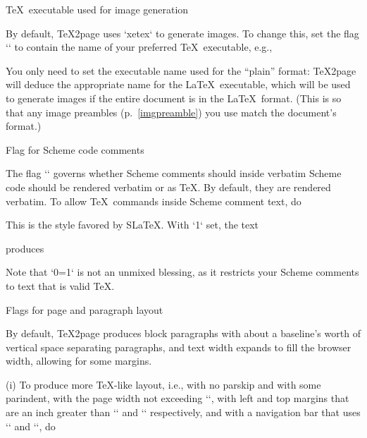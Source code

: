 \begintt
\def\TZPimageconverter{imagemagick}  %
\def\TZPimageconverter{netpbm}       %

\def\TZPimageformat{png}  %
\def\TZPimageformat{jpeg} %
\def\TZPimageformat{gif}  %
\endtt

\beginsection \TeX\ executable used for image generation

By default, \TeX2page uses `xetex` to
generate images. To change this, set the flag `\TZPtexprogname` to
contain the name of your preferred \TeX\ executable, e.g.,

\begintt
\def\TZPtexprogname{pdftex}
\endtt
%
You only need to set the executable name used for the “plain” format:
\TeX2page will deduce the appropriate name for the \LaTeX\ executable,
which will be used to generate images if the entire document is in the
\LaTeX\ format.  (This is so that any image preambles
(p.~\ref{imgpreamble}) you use match the
document’s format.)

\beginsection Flag for Scheme code comments

The flag `\TZPslatexcomments` governs whether Scheme comments
should inside verbatim Scheme code should be rendered verbatim or as \TeX.
By default, they are rendered verbatim.   To allow \TeX\ commands inside
Scheme comment text, do

\begintt
\let\TZPslatexcomments=1
\endtt
%
This is the style favored by S\LaTeX.
\ifx\shipout\UnDeFiNeD
With `\TZPslatexcomments` set, the text

\begintt
{}
\endtt
%
produces
\let\TZPslatexcomments 1

\let\TZPslatexcomments 0

\fi
Note that `\TZPslatexcomments=1` is not an unmixed blessing, as it
restricts your Scheme comments to text that is valid \TeX.

\beginsection Flags for page and paragraph layout

%
By default, \TeX2page produces block paragraphs with about a
baseline’s worth of vertical space separating paragraphs, and text width
expands to fill the browser width, allowing for some margins.

\item(i) To produce more \TeX-like layout, i.e., with no parskip and
with some parindent,
with the page width not exceeding `\hsize`,
with left and top margins that are an inch greater than
`\hoffset` and `\voffset` respectively, and with a
navigation bar that uses `\headline` and `\footline`,
do

